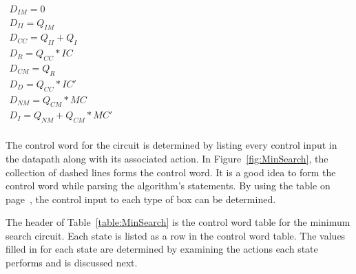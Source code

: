 $\begin{array}{l}
D_{IM} = 0 \\
D_{II} = Q_{IM} \\
D_{CC} = Q_{II} + Q_{I} \\
D_{R}  = Q_{CC} * IC \\
D_{CM} = Q_{R}  \\
D_{D}  = Q_{CC} * IC' \\
D_{NM} = Q_{CM} * MC \\
D_{I}  = Q_{NM} + Q_{CM}*MC' \\
\end{array}$

The control word for the circuit is determined by listing every control
input in the datapath along with its associated action.  In 
Figure~\ref{fig:MinSearch}, the collection of dashed lines forms the 
control word.  It is a good idea to form the control word while parsing 
the algorithm's statements.  By using the table on 
page~\pageref{page:boxlist}, the control input to each 
type of box can be determined.

The header of Table~\ref{table:MinSearch} is the control word table for
the minimum search circuit. Each state is listed as a row in the control 
word table.  The values filled in for each state are determined by examining
the actions each state performs and is discussed next.

